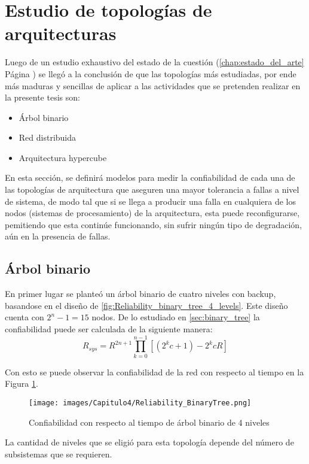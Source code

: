 \section{Estudio de topologías de arquitecturas}\label{seccion:TopologiaEstudio}
Luego de un estudio exhaustivo del estado de la cuestión (\autoref{chap:estado_del_arte} Página \pageref{chap:estado_del_arte}) se llegó a la conclusión de que las topologías más estudiadas, por ende más maduras y sencillas de aplicar a las actividades que se pretenden realizar en la presente tesis son:
\begin{itemize}
  \item Árbol binario
  \item Red distribuida
  \item Arquitectura hypercube
\end{itemize}

En esta sección, se definirá modelos para medir la confiabilidad de cada una de las topologías de arquitectura que aseguren una mayor tolerancia a fallas a nivel de sistema, de modo tal que si se llega a producir una falla en cualquiera de los nodos (sistemas de procesamiento) de la arquitectura, esta puede reconfigurarse, pemitiendo que esta continúe funcionando, sin sufrir ningún tipo de degradación, aún en la presencia de fallas.

\subsection{Árbol binario}
En primer lugar se planteó un árbol binario de cuatro niveles con backup, basandose en el diseño de \cite{Raghavendra84} \ref{fig:Reliability_binary_tree_4_levels}. Este diseño cuenta con $2^n - 1 =  15$ nodos. De lo estudiado en \autoref{sec:binary_tree} la confiabilidad puede ser calculada de la siguiente manera: $$R_{sys} = R^{2n +1} \prod_{k=0}^{n-1}{[(2^kc+1) - 2^kcR]}$$

Con esto se puede observar la confiabilidad de la red con respecto al tiempo en la Figura \ref{fig:Reliability_binary_tree_4_levels_2}.

\begin{figure}[H]
 \centering
 \texttt{[image: images/Capitulo4/Reliability\_BinaryTree.png]}
  \caption{Confiabilidad con respecto al tiempo de árbol binario de 4 niveles}
\label{fig:Reliability_binary_tree_4_levels_2}
\end{figure}

La cantidad de niveles que se eligió para esta topología depende del número de subsistemas que se requieren.

